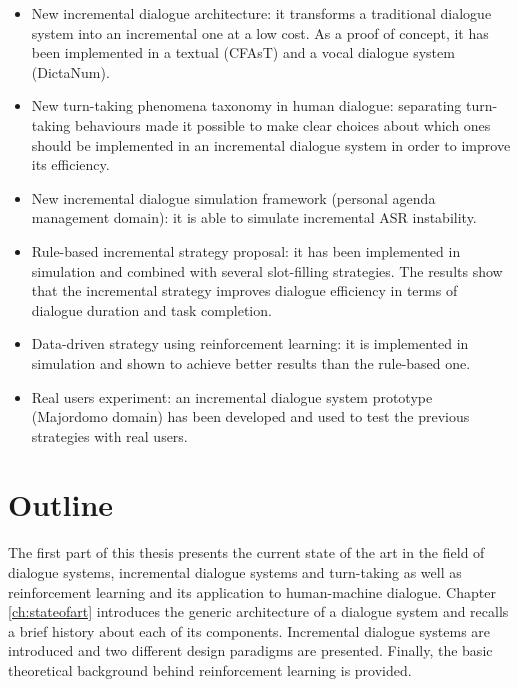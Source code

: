 				\begin{itemize}
					\item New incremental dialogue architecture: it transforms a traditional dialogue system into an incremental one at a low cost. As a proof of concept, it has been implemented in a textual (CFAsT) and a vocal dialogue system (DictaNum).
					\item New turn-taking phenomena taxonomy in human dialogue: separating turn-taking behaviours made it possible to make clear choices about which ones should be implemented in an incremental dialogue system in order to improve its efficiency.
					\item New incremental dialogue simulation framework (personal agenda management domain): it is able to simulate incremental ASR instability.
					\item Rule-based incremental strategy proposal: it has been implemented in simulation and combined with several slot-filling strategies. The results show that the incremental strategy improves dialogue efficiency in terms of dialogue duration and task completion.
					\item Data-driven strategy using reinforcement learning: it is implemented in simulation and shown to achieve better results than the rule-based one.
					\item Real users experiment: an incremental dialogue system prototype (Majordomo domain) has been developed and used to test the previous strategies with real users.
				\end{itemize}
				
\section*{Outline}

				The first part of this thesis presents the current state of the art in the field of dialogue systems, incremental dialogue systems and turn-taking as well as reinforcement learning and its application to human-machine dialogue. Chapter \ref{ch:stateofart} introduces the generic architecture of a dialogue system and recalls a brief history about each of its components. Incremental dialogue systems are introduced and two different design paradigms are presented. Finally, the basic theoretical background behind reinforcement learning is provided.
				
